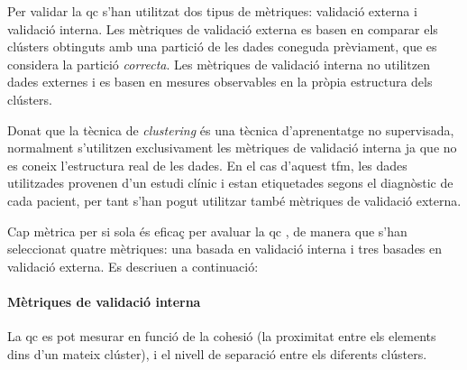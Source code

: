 \documentclass[CAT,BIB]{TFUOC}%
\begin{document}
        Per validar la \gls{qc}
        s'han utilitzat dos tipus de mètriques:
        validació externa i validació interna.
        Les mètriques de validació externa
        es basen en comparar els clústers obtinguts
        amb una partició de les dades coneguda prèviament,
        que es considera la partició \textit{correcta}.
        Les mètriques de validació interna
        no utilitzen dades externes i
        es basen en mesures observables
        en la pròpia estructura dels clústers.

        Donat que la tècnica de \textit{clustering}
        és una tècnica d'aprenentatge no supervisada,
        normalment s'utilitzen exclusivament les mètriques de validació interna
        ja que no es coneix l'estructura real de les dades.
        En el cas d'aquest \gls{tfm},
        les dades utilitzades provenen d'un estudi clínic
        i estan etiquetades segons el diagnòstic de cada pacient,
        per tant s'han pogut utilitzar també mètriques de validació externa.

        Cap mètrica per si sola és eficaç
        per avaluar la \gls{qc} \cite{Palacio-Nino2019},
        de manera que s'han seleccionat quatre mètriques:
        una basada en validació interna
        i tres basades en validació externa.
        Es descriuen a continuació:

        \paragraph{Mètriques de validació interna}
            La \gls{qc} es pot mesurar en funció de
            la cohesió
            (la proximitat entre els elements dins d'un mateix clúster),
            i el nivell de separació entre els diferents clústers.
\end{document}
